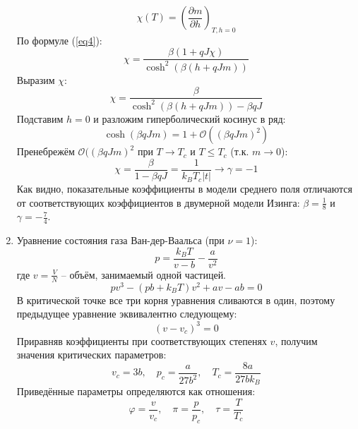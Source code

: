 \documentclass[12pt]{article}
\begin{document}
\begin{enumerate}
    \begin{equation}
        \chi(T)=\left(\frac{\partial m}{\partial h}\right)_{T,h=0}
    \end{equation}
    По формуле (\ref{eq4}):
    \begin{equation}
        \chi=\frac{\beta(1+qJ\chi)}{\cosh^2(\beta(h+qJm))}
    \end{equation}
    Выразим $\chi$:
    \begin{equation}
        \chi=\frac{\beta}{\cosh^2(\beta(h+qJm))-\beta qJ}
    \end{equation}
    Подставим $h=0$ и разложим гиперболический косинус в ряд:
    \begin{equation}
        \cosh(\beta qJm)=1+\mathcal{O}((\beta qJm)^2)
    \end{equation}
    Пренебрежём $\mathcal{O}((\beta qJm)^2$ при $T\rightarrow T_c$ и $T\leq T_c$ (т.к. $m\rightarrow 0$):
    \begin{equation}
        \chi=\frac{\beta}{1-\beta qJ}=\frac{1}{k_BT_c|t|}\rightarrow \boxed{\gamma=-1}
    \end{equation}
    Как видно, показательные коэффициенты в модели среднего поля отличаются от соответствующих коэффициентов в двумерной модели Изинга: $\beta=\frac{1}{8}$ и $\gamma=-\frac{7}{4}$.
    \item Уравнение состояния газа Ван-дер-Ваальса (при $\nu=1$):
    \begin{equation}\label{eq5}
        p=\frac{k_BT}{v-b}-\frac{a}{v^2}
    \end{equation}
    где $v=\frac{V}{N}$ -- объём, занимаемый одной частицей.
    \begin{equation}
        pv^3-(pb+k_BT)v^2+av-ab=0
    \end{equation}
    В критической точке все три корня уравнения сливаются в один, поэтому предыдущее уравнение эквивалентно следующему:
    \begin{equation}
        (v-v_c)^3=0
    \end{equation}
    Приравняв коэффициенты при соответствующих степенях $v$, получим значения критических параметров:
    \begin{equation}
        v_c=3b,\quad p_c=\frac{a}{27b^2},\quad T_c=\frac{8a}{27bk_B}
    \end{equation}
    Приведённые параметры определяются как отношения:
    \begin{equation}
        \varphi=\frac{v}{v_c},\quad \pi=\frac{p}{p_c},\quad \tau=\frac{T}{T_c}
    \end{equation}

\end{enumerate}
\end{document}

